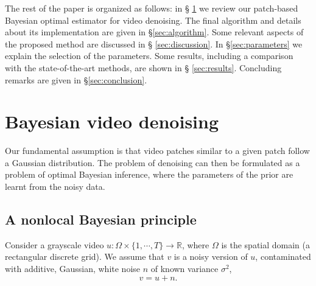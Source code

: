 \documentclass[10pt, journal, twocolumn, final, a4paper]{IEEEtran}
\newcommand{\ma}[1]{\boldsymbol{#1}}
\newcommand{\ie}{\emph{i.e}. } \newcommand{\Ie}{\emph{I.e}. }
\begin{document}
\bigskip

The rest of the paper is organized as follows: in \S
\ref{sec:review_nonlocal_Bayes} we review our patch-based Bayesian optimal estimator for
video denoising. The final algorithm and details about its implementation are
given in \S \ref{sec:algorithm}.
Some relevant aspects of the proposed method are discussed in \S
\ref{sec:discussion}.
In \S \ref{sec:parameters}
we explain the selection of the parameters. Some results, including a
comparison with the state-of-the-art methods, are shown in \S
\ref{sec:results}. Concluding remarks are given in \S \ref{sec:conclusion}.

\section{Bayesian video denoising}
\label{sec:review_nonlocal_Bayes}

Our fundamental assumption is that video patches similar to a given
patch follow a Gaussian distribution.
The problem 
of denoising can then be formulated as a problem of optimal Bayesian inference, where the
parameters of the prior are learnt from the noisy data.

%



\subsection{A nonlocal Bayesian principle}

Consider a grayscale video $u:\Omega\times \{1,\cdots,T\}\rightarrow
\mathbb R$, where $\Omega$ is the spatial domain (a rectangular discrete grid).
We assume that $v$ is a noisy version of $u$, contaminated with additive,
Gaussian, white noise $n$ of known variance $\sigma^2$,
\[v = u + n.\]
\end{document}
